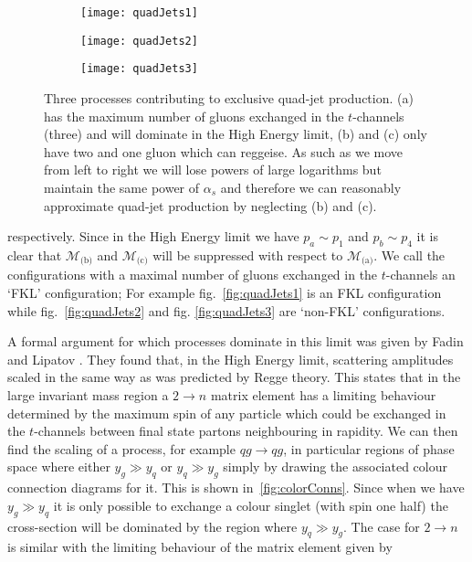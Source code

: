 	\begin{figure}[bt]

		\centering

		\begin{subfigure}[b]{0.31\textwidth}
			\texttt{[image: quadJets1]}
			\caption{}
			\label{fig:quadJets1}
		\end{subfigure}
		\begin{subfigure}[b]{0.31\textwidth}
			\texttt{[image: quadJets2]}
			\caption{}
			\label{fig:quadJets2}
		\end{subfigure}
		\begin{subfigure}[b]{0.31\textwidth}
			\texttt{[image: quadJets3]}
			\caption{}
			\label{fig:quadJets3}
		\end{subfigure}

		\caption{Three processes contributing to exclusive quad-jet production. (a) has the
		maximum number of gluons exchanged in the $t$-channels (three) and will dominate in the High
		Energy limit, (b) and (c) only have two and one gluon which can reggeise.  As such as we move
		from left to right we will lose powers of large logarithms but maintain the same power of
		$\alpha_s$ and therefore we can reasonably approximate quad-jet production by neglecting
		(b) and (c).}
		\label{fig:quadJets}
	\end{figure}

	respectively.  Since in the High
	Energy limit we have $p_a\sim p_1$ and $p_b\sim p_4$ it is clear that $\mathcal{M}_{\text{(b)}}$
	and $\mathcal{M}_{\text{(c)}}$ will be suppressed with respect to $\mathcal{M}_{\text{(a)}}$. We call
	the configurations with a maximal number of gluons exchanged in the $t$-channels an `FKL' configuration;
	For example fig.~\eqref{fig:quadJets1} is an FKL configuration while fig.~\eqref{fig:quadJets2} and fig.
	\eqref{fig:quadJets3} are `non-FKL' configurations.

	A formal argument for which processes dominate in this limit was given by Fadin and Lipatov
	\cite{Kuraev:1976ge,Balitsky:1978ic}.  They found that, in the High Energy limit, scattering
	amplitudes scaled in the same way as was predicted by Regge theory.  This states that in the
	large invariant mass region a $2\to n$ matrix element has a limiting behaviour determined by
	the maximum spin of any particle which could be exchanged in the $t$-channels between final
	state partons neighbouring in rapidity.  We can then find the scaling of a process, for example
	$qg\to qg$, in particular regions of phase space where either $y_g\gg y_q$ or $y_q\gg y_g$ simply
	by drawing the associated colour connection diagrams for it.  This is shown in~\eqref{fig:colorConns}.
	Since when we have $y_g\gg y_q$ it is only possible to exchange a colour singlet (with spin one half)
	the cross-section will be dominated by the region where $y_q\gg y_g$.  The case for $2\to n$ is similar
	with the limiting behaviour of the matrix element given by

